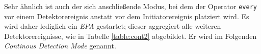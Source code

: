 \documentclass{acm_proc_article-sp}
\begin{document}
\begin{table}[ht]
    \caption{\textit{Continous Consumption Mode}}
    \label{table:cont}\vspace{0.2cm}
\end{table}

Sehr ähnlich ist auch der sich anschließende Modus, bei dem der Operator \texttt{every} 
vor einem Detektorereignis anstatt vor dem Initiatorereignis platziert wird. Es wird 
daher lediglich ein \textit{EPA} gestartet; dieser aggregiert alle weiteren 
Detektorereignisse, wie in Tabelle \ref{table:cont2} abgebildet. Er wird im Folgenden 
\textit{Continous Detection Mode} genannt.

\begin{table}[ht]
    \caption{\textit{Continous Detection Mode}}
    \label{table:cont2}\vspace{0.2cm}
\end{table}
\end{document}
